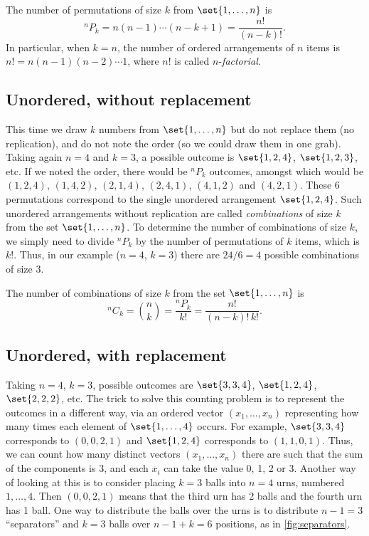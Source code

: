 \begin{theorem}\label{thm:count-ordered-without-replacement}
The number of permutations of size $k$ from $\set{1, \ldots, n}$ is
\[
  {}^nP_k = n(n-1)\cdots(n-k+1) = \frac{n!}{(n-k)!}.
\]
In particular, when $k = n$, the number of ordered arrangements of $n$ items is $n! = n(n-1)(n-2)\cdots 1$, where $n!$ is called $n$-\emph{factorial}.
\end{theorem}

\subsection{Unordered, without replacement}\label{sec:count-unordered-without}

This time we draw $k$ numbers from $\set{1, \ldots, n}$ but do not replace them (no replication), and do not note the order (so we could draw them in one grab). Taking again $n = 4$ and $k = 3$, a possible outcome is $\set{1, 2, 4}$, $\set{1, 2, 3}$, etc. If we noted the order, there would be ${}^nP_k$ outcomes, amongst which would be $(1,2,4)$, $(1,4,2)$, $(2,1,4)$, $(2,4,1)$, $(4,1,2)$ and $(4,2,1)$. These 6 permutations correspond to the single unordered arrangement $\set{1, 2, 4}$. Such unordered arrangements without replication are called \emph{combinations} of size $k$ from the set $\set{1, \ldots, n}$. To determine the number of combinations of size $k$, we simply need to divide ${}^nP_k$ by the number of permutations of $k$ items, which is $k!$. Thus, in our example ($n = 4$, $k = 3$) there are $24/6 = 4$ possible combinations of size 3.

\begin{theorem}\label{thm:count-unordered-without-replacement}
The number of combinations of size $k$ from the set $\set{1, \ldots, n}$ is
\[
  {}^nC_k = \binom{n}{k} = \frac{{}^nP_k}{k!} = \frac{n!}{(n-k)!\,k!}.
\]
\end{theorem}

\subsection{Unordered, with replacement}\label{sec:count-unordered-with}

Taking $n = 4$, $k = 3$, possible outcomes are $\set{3, 3, 4}$, $\set{1, 2, 4}$, $\set{2, 2, 2}$, etc. The trick to solve this counting problem is to represent the outcomes in a different way, via an ordered vector $(x_1, \ldots, x_n)$ representing how many times each element of $\set{1, \ldots, 4}$ occurs. For example, $\set{3, 3, 4}$ corresponds to $(0, 0, 2, 1)$ and $\set{1, 2, 4}$ corresponds to $(1, 1, 0, 1)$. Thus, we can count how many distinct vectors $(x_1, \ldots, x_n)$ there are such that the sum of the components is 3, and each $x_i$ can take the value 0, 1, 2 or 3. Another way of looking at this is to consider placing $k = 3$ balls into $n = 4$ urns, numbered $1, \ldots, 4$. Then $(0, 0, 2, 1)$ means that the third urn has 2 balls and the fourth urn has 1 ball. One way to distribute the balls over the urns is to distribute $n - 1 = 3$ ``separators'' and $k = 3$ balls over $n - 1 + k = 6$ positions, as in \cref{fig:separators}.

